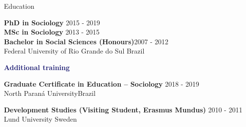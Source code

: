 \begin{rSection}{Education}

{\bf PhD in Sociology} \hfill {2015 - 2019} \\
{\bf MSc in Sociology} \hfill {2013 - 2015} \\
{\bf Bachelor in Social Sciences (Honours)}\hfill {2007 - 2012}\\
{Federal University of Rio Grande do Sul} \hfill {Brazil}

\textcolor{MidnightBlue}{\textbf{Additional training}}

{\textbf{Graduate Certificate in Education – Sociology }}{\hfill  2018 - 2019}\\ 
{North Paraná University}\hfill{Brazil}\par
{\bf Development Studies (Visiting Student, Erasmus Mundus)} \hfill 
{2010 - 2011} \\
{Lund University} \hfill {Sweden} 

\end{rSection}
